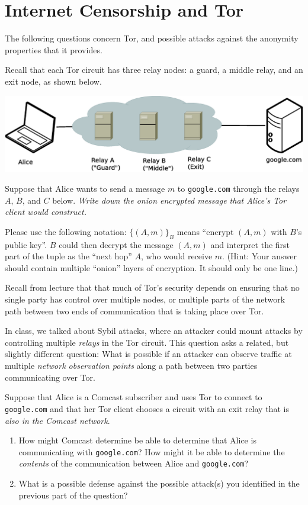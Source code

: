 \newpage
\section{Internet Censorship and Tor}

The following questions concern Tor, and possible attacks against the
anonymity properties that it provides.

Recall that each Tor circuit has three relay nodes: a guard, a middle relay,
and an exit node, as shown below. 

\begin{center}
\includegraphics[width=0.65\linewidth]{tor}
\end{center}

Suppose that Alice wants to send a message $m$ to {\tt google.com} through the relays
$A$, $B$, and $C$ below.  {\em Write down the onion encrypted message that Alice's
Tor client would construct.}

Please use the following notation: $\{(A, m)\}_B$ means ``encrypt
$(A,m)$ with $B$'s public key''. $B$ could then decrypt the message $(A,m)$ and
interpret the first part of the tuple as the ``next hop'' $A$, who would receive $m$.  (Hint: Your answer should contain multiple
``onion'' layers of encryption. It should only be one line.)
\eprob

\newpage
{} 
Recall from lecture that that much of Tor's security depends on
ensuring that no single party has control over multiple nodes, or multiple
parts of the network path between two ends of communication that is taking
place over Tor.  

In class, we talked about Sybil attacks, where an attacker could mount attacks
by controlling multiple {\em relays} in the Tor circuit. This question asks a
related, but slightly different question: What is possible if an attacker can
observe traffic at multiple {\em network observation points} along a path
between two parties communicating over Tor.

Suppose that Alice is a Comcast subscriber and uses Tor to connect to {\tt
google.com} and that her Tor client chooses a circuit with an exit relay that is
{\em also in the Comcast network}.

\begin{enumerate} 
	\item How might Comcast determine be able to determine that Alice is communicating
	with {\tt google.com}? How might it be able to determine the {\em contents}
	of the communication between Alice and {\tt google.com}? 

\item What is a possible defense against the possible attack(s) you
identified in the previous part of the question?
\end{enumerate}

\eprob